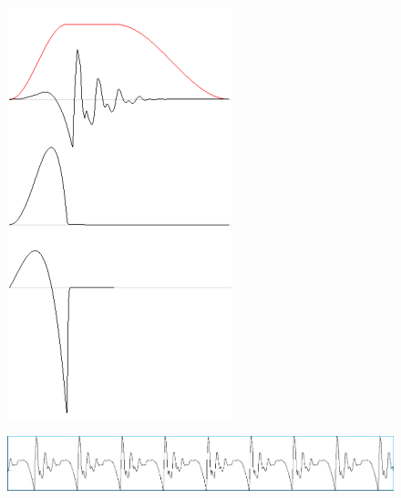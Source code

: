 \documentclass[conference]{IEEEtran}
\begin{document}
\begin{figure}[!t]
  \begin{minipage}[b]{0.2\columnwidth}
    \includegraphics[width=\textwidth]{signal1}
  \end{minipage}
  \hfil
  \begin{minipage}[b]{0.8\columnwidth}
    \includegraphics[width=\textwidth]{signal2}\\

\end{minipage}
\end{figure}
\end{document}
